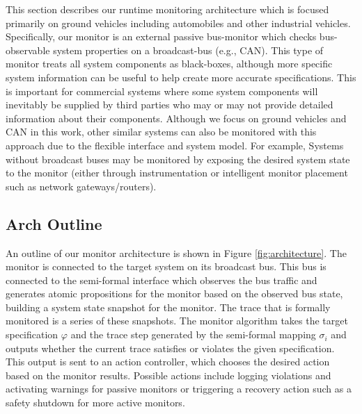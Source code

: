 \documentclass[]{../llncs/llncs}
\newcommand{\agmon}{\ensuremath{\mathbf{agmon}}}
\begin{document}
This section describes our runtime monitoring architecture which is focused primarily on ground vehicles including automobiles and other industrial vehicles. Specifically, our monitor is an external passive bus-monitor which checks bus-observable system properties on a broadcast-bus (e.g., CAN). 
This type of monitor treats all system components as black-boxes, although more specific system information can be useful to help create more accurate specifications. This is important for commercial systems where some system components will inevitably be supplied by third parties who may or may not provide detailed information about their components. 
Although we focus on ground vehicles and CAN in this work, other similar systems can also be monitored with this approach due to the flexible interface and system model.
For example, Systems without broadcast buses may be monitored by exposing the desired system state to the monitor (either through instrumentation or intelligent monitor placement such as network gateways/routers).

\subsection{Arch Outline}
An outline of our monitor architecture is shown in Figure \ref{fig:architecture}. The monitor is connected to the target system on its broadcast bus. This bus is connected to the semi-formal interface which observes the bus traffic and generates atomic propositions for the monitor based on the observed bus state, building a system state snapshot for the monitor. 
The trace that is formally monitored is a series of these snapshots. The monitor algorithm takes the target specification $\varphi$ and the trace step generated by the semi-formal mapping $\sigma_i$ and outputs whether the current trace satisfies or violates the given specification. 
This output is sent to an action controller, which chooses the desired action based on the monitor results. Possible actions include logging violations and activating warnings for passive monitors or triggering a recovery action such as a safety shutdown for more active monitors.

\end{document}

